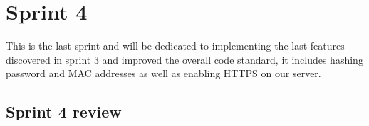 \chapter{Sprint 4}
This is the last sprint and will be dedicated to implementing the last features discovered in sprint 3 and improved the overall code standard, it includes hashing password and MAC addresses as well as enabling HTTPS on our server. %







\section{Sprint 4 review}